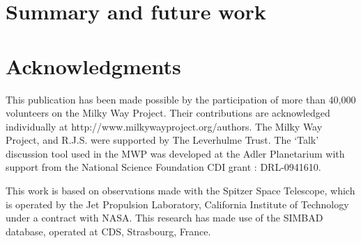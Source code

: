 \documentclass[times,usenatbib]{mn2e}
\begin{document}
\section{Summary and future work}

\section*{Acknowledgments}

This publication has been made possible by the participation of more than 40,000 volunteers on the Milky Way Project. Their contributions are acknowledged individually at http://www.milkywayproject.org/authors. The Milky Way Project, and R.J.S. were supported by The Leverhulme Trust. The `Talk' discussion tool used in the MWP was developed at the Adler Planetarium with support from the National Science Foundation CDI grant : DRL-0941610. 

This work is based on observations made with the Spitzer Space Telescope, which is operated by the Jet Propulsion Laboratory, California Institute of Technology under a contract with NASA. This research has made use of the SIMBAD database, operated at CDS, Strasbourg, France.




\clearpage

\end{document}
